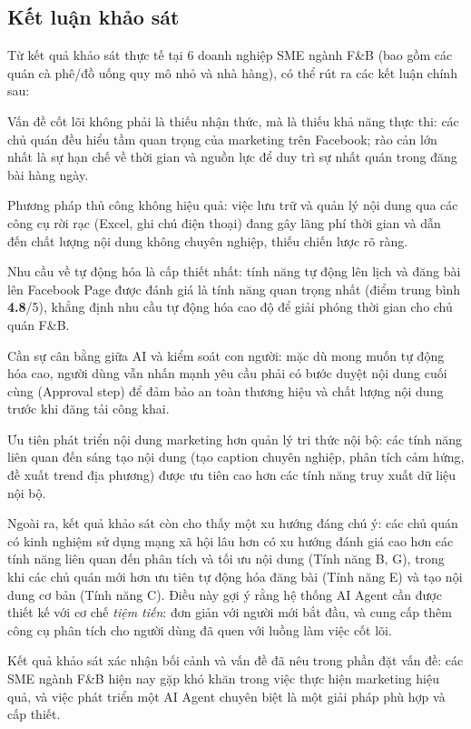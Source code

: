 \subsection{Kết luận khảo sát}

Từ kết quả khảo sát thực tế tại 6 doanh nghiệp SME ngành F\&B (bao gồm
các quán cà phê/đồ uống quy mô nhỏ và nhà hàng), có thể rút ra các kết
luận chính sau:

Vấn đề cốt lõi không phải là thiếu nhận thức, mà là thiếu khả năng thực
thi: các chủ quán đều hiểu tầm quan trọng của marketing trên Facebook;
rào cản lớn nhất là sự hạn chế về thời gian và nguồn lực để duy trì sự
nhất quán trong đăng bài hàng ngày.

Phương pháp thủ công không hiệu quả: việc lưu trữ và quản lý nội dung
qua các công cụ rời rạc (Excel, ghi chú điện thoại) đang gây lãng phí
thời gian và dẫn đến chất lượng nội dung không chuyên nghiệp, thiếu chiến
lược rõ ràng.

Nhu cầu về tự động hóa là cấp thiết nhất: tính năng tự động lên lịch và
đăng bài lên Facebook Page được đánh giá là tính năng quan trọng nhất
(điểm trung bình \textbf{4.8}/5), khẳng định nhu cầu tự động hóa cao độ
để giải phóng thời gian cho chủ quán F\&B.

Cần sự cân bằng giữa AI và kiểm soát con người: mặc dù mong muốn tự động
hóa cao, người dùng vẫn nhấn mạnh yêu cầu phải có bước duyệt nội dung
cuối cùng (Approval step) để đảm bảo an toàn thương hiệu và chất lượng
nội dung trước khi đăng tải công khai.

Ưu tiên phát triển nội dung marketing hơn quản lý tri thức nội bộ: các
tính năng liên quan đến sáng tạo nội dung (tạo caption chuyên nghiệp,
phân tích cảm hứng, đề xuất trend địa phương) được ưu tiên cao hơn các
tính năng truy xuất dữ liệu nội bộ.

Ngoài ra, kết quả khảo sát còn cho thấy một xu hướng đáng chú ý: các
chủ quán có kinh nghiệm sử dụng mạng xã hội lâu hơn có xu hướng đánh
giá cao hơn các tính năng liên quan đến phân tích và tối ưu nội dung
(Tính năng B, G), trong khi các chủ quán mới hơn ưu tiên tự động hóa
đăng bài (Tính năng E) và tạo nội dung cơ bản (Tính năng C). Điều này
gợi ý rằng hệ thống AI Agent cần được thiết kế với cơ chế \emph{tiệm
tiến}: đơn giản với người mới bắt đầu, và cung cấp thêm công cụ phân
tích cho người dùng đã quen với luồng làm việc cốt lõi.

Kết quả khảo sát xác nhận bối cảnh và vấn đề đã nêu trong phần đặt vấn
đề: các SME ngành F\&B hiện nay gặp khó khăn trong việc thực hiện
marketing hiệu quả, và việc phát triển một AI Agent chuyên biệt là một
giải pháp phù hợp và cấp thiết.

